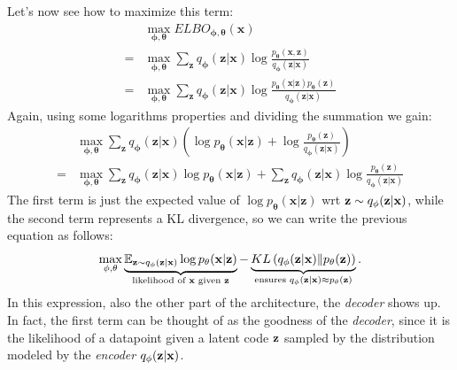 Let's now see how to maximize this term:
\begin{align}
	&\max_{\mathbf{\phi}, \mathbf{\theta}} ELBO_{\mathbf{\phi}, \mathbf{\theta}}(\mathbf{x}) \\
	= &\max_{\mathbf{\phi}, \mathbf{\theta}} \sum_{\mathbf{z}} q_\mathbf{\phi}(\mathbf{z} | \mathbf{x}) \log \frac{p_\mathbf{\theta}(\mathbf{x}, \mathbf{z})}{q_\mathbf{\phi}(\mathbf{z} | \mathbf{x})} \\
	= &\max_{\mathbf{\phi}, \mathbf{\theta}} \sum_{\mathbf{z}} q_\mathbf{\phi}(\mathbf{z} | \mathbf{x}) \log \frac{p_\mathbf{\theta}(\mathbf{x}|\mathbf{z})p_\mathbf{\theta}(\mathbf{z})}{q_\mathbf{\phi}(\mathbf{z} | \mathbf{x})}
\end{align}
Again, using some logarithms properties and dividing the summation we gain:
\begin{align}
	&\max_{\mathbf{\phi}, \mathbf{\theta}} \sum_{\mathbf{z}} q_\mathbf{\phi}(\mathbf{z} | \mathbf{x}) \left( \log p_\mathbf{\theta}(\mathbf{x}|\mathbf{z}) + \log\frac{p_\mathbf{\theta}(\mathbf{z})}{q_\mathbf{\phi}(\mathbf{z} | \mathbf{x})} \right) \\
	= &\max_{\mathbf{\phi}, \mathbf{\theta}} \sum_{\mathbf{z}} q_\mathbf{\phi}(\mathbf{z} | \mathbf{x}) \log p_\mathbf{\theta}(\mathbf{x}|\mathbf{z}) + \sum_{\mathbf{z}} q_\mathbf{\phi}(\mathbf{z} | \mathbf{x}) \log\frac{p_\mathbf{\theta}(\mathbf{z})}{q_\mathbf{\phi}(\mathbf{z} | \mathbf{x})} 
\end{align}
The first term is just the expected value of $\log p_\mathbf{\theta}(\mathbf{x}|\mathbf{z})$ wrt $\vb{z} \sim q_\mathbf{\phi}(\mathbf{z} | \mathbf{x})$, while the second term represents a KL divergence, so we can write the previous equation as follows:
\begin{equation}\label{eq:var_enc_loss}
	\max_{\mathbf{\phi}, \mathbf{\theta}} \underbrace{\mathbb{E}_{\vb{z} \sim q_\mathbf{\phi}(\mathbf{z}|\mathbf{x})} \log p_\mathbf{\theta}(\mathbf{x}|\mathbf{z})}_{\mathclap{\text{likelihood of } \vb{x} \text{ given } \vb{z}}} - \underbrace{KL\left( q_\mathbf{\phi}(\mathbf{z} | \mathbf{x}) \| p_\mathbf{\theta}(\mathbf{z}) \right)}_{\mathclap{\text{ensures } q_{\phi}(\vb{z} | \vb{x}) \approx p_{\theta}(\vb{z})}}.
\end{equation}
In this expression, also the other part of the architecture, the \emph{decoder} shows up. In fact, the first term can be thought of as the goodness of the \emph{decoder}, since it is the likelihood of a datapoint given a latent code $\vb{z}$ sampled by the distribution modeled by the \emph{encoder} $q_{\phi}(\vb{z} | \vb{x})$.
 
